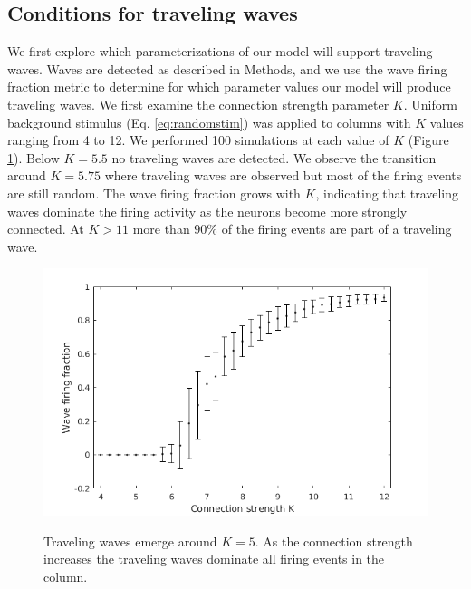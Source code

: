\documentclass[a4paper,11pt]{article}
\begin{document}
\subsection{Conditions for traveling waves} \label{sub:waves}
We first explore which parameterizations of our model will support traveling waves.
Waves are detected as described in Methods, and we use the wave firing fraction metric to determine for which parameter values our model will produce traveling waves.
We first examine the connection strength parameter $K$.
Uniform background stimulus (Eq. \ref{eq:randomstim}) was applied to columns with $K$ values ranging from 4 to 12.
We performed 100 simulations at each value of $K$ (Figure \ref{fig:conn_fraction}).
Below $K=5.5$ no traveling waves are detected.
We observe the transition around $K=5.75$ where traveling waves are observed but most of the firing events are still random.
The wave firing fraction grows with $K$, indicating that traveling waves dominate the firing activity as the neurons become more strongly connected.
At $K>11$ more than $90\%$ of the firing events are part of a traveling wave.
\begin{figure}[!ht]
 \caption{Traveling waves emerge around $K=5$. As the connection strength increases the traveling waves dominate all firing events in the column.}
 \centering
   \includegraphics[width=\textwidth]{fig/ConnectionStrengthWaveFraction}  
 \label{fig:conn_fraction}
\end{figure}
\end{document}
